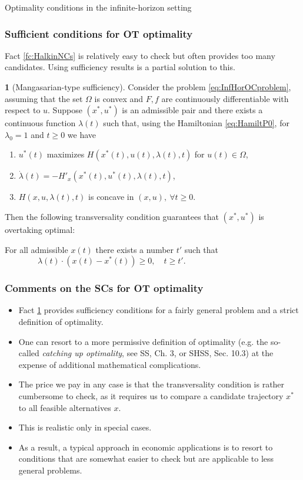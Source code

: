 \documentclass[10pt]{beamer}
\theoremstyle{definition}
\newtheorem{Fact}{\translate{Fact}}
\begin{document}
\begin{section}{Optimality conditions in the infinite-horizon setting}
\begin{frame}[fragile]
\frametitle{Sufficient conditions for OT optimality}
Fact \ref{fc:HalkinNCs} is relatively easy to check but often provides too many candidates. Using sufficiency results is a partial solution to this. \pause

\begin{Fact}[Mangasarian-type sufficiency]
Consider the problem \eqref{eq:InfHorOCproblem}, assuming that the set $ \Omega $ is convex and $ F,f $ are continuously differentiable with respect to $ u $. Suppose $ (x^*,u^*) $ is an admissible pair and there exists a continuous function $ \lambda(t) $ such that, using the Hamiltonian \eqref{eq:HamiltP0}, for $ \lambda_0=1 $ and $ t\geq 0 $ we have
\begin{enumerate}
\item $ u^*(t) $ maximizes $ H(x^*(t),u(t),\lambda(t),t )$ for $ u(t)\in \Omega $,
\item $ \dot{\lambda}(t) = -H'_x(x^*(t),u^*(t),\lambda(t),t) $,
\item $ H(x,u,\lambda(t),t ) $ is concave in $ (x,u),~\forall t \geq 0 $.
\end{enumerate}

Then the following transversality condition guarantees that $ (x^*,u^*) $ is overtaking optimal:

For all admissible $ x(t) $ there exists a number $ t' $ such that \newline
${} \qquad \qquad \lambda(t)\cdot (x(t)-x^*(t))\geq 0,\quad t\geq t'. $ 
\label{fc:SCsOT}
\end{Fact}
\end{frame}

\begin{frame}[fragile]
\frametitle{Comments on the SCs for OT optimality}
\begin{itemize}\itemsep1em
\item Fact \ref{fc:SCsOT} provides sufficiency conditions for a fairly general problem and a strict definition of optimality.
\item One can resort to a more permissive definition of optimality (e.g. the so-called \emph{catching up optimality}, see SS, Ch. 3, or SHSS, Sec. 10.3) at the expense of additional mathematical complications.
\item The price we pay in any case is that the transversality condition is rather cumbersome to check, as it requires us to compare a candidate trajectory $ x^* $ to all feasible alternatives $ x $.
\item This is realistic only in special cases.
\item As a result, a typical approach in economic applications is to resort to conditions that are somewhat easier to check but are applicable to less general problems.
\end{itemize}
\end{frame}


\end{section}
\end{document}

